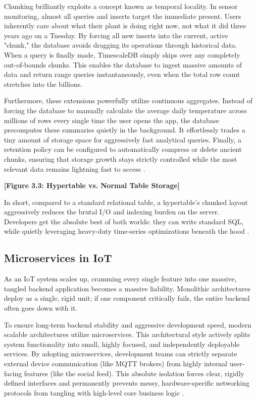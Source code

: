 Chunking brilliantly exploits a concept known as temporal locality. In sensor monitoring, almost all queries and inserts target the immediate present. Users inherently care about what their plant is doing right now, not what it did three years ago on a Tuesday. By forcing all new inserts into the current, active "chunk," the database avoids dragging its operations through historical data. When a query is finally made, TimescaleDB simply skips over any completely out-of-bounds chunks. This enables the database to ingest massive amounts of data and return range queries instantaneously, even when the total row count stretches into the billions.

Furthermore, these extensions powerfully utilize continuous aggregates. Instead of forcing the database to manually calculate the average daily temperature across millions of rows every single time the user opens the app, the database precomputes these summaries quietly in the background. It effortlessly trades a tiny amount of storage space for aggressively fast analytical queries. Finally, a retention policy can be configured to automatically compress or delete ancient chunks, ensuring that storage growth stays strictly controlled while the most relevant data remains lightning fast to access \cite{tigerdata_best_practices_hypertables, tigerdata_timescale_alternatives, tigerdata_caggs_retention, tigerdata_tsdb_compared}.

\textbf{[Figure 3.3: Hypertable vs. Normal Table Storage]}

In short, compared to a standard relational table, a hypertable's chunked layout aggressively reduces the brutal I/O and indexing burden on the server. Developers get the absolute best of both worlds: they can write standard SQL, while quietly leveraging heavy-duty time-series optimizations beneath the hood \cite{tigerdata_caggs_retention, tigerdata_tsdb_compared, tigerdata_best_practices_hypertables}.


\subsection{Microservices in IoT}

As an IoT system scales up, cramming every single feature into one massive, tangled backend application becomes a massive liability. Monolithic architectures deploy as a single, rigid unit; if one component critically fails, the entire backend often goes down with it. 

To ensure long-term backend stability and aggressive development speed, modern scalable architectures utilize microservices. This architectural style actively splits system functionality into small, highly focused, and independently deployable services. By adopting microservices, development teams can strictly separate external device communication (like MQTT brokers) from highly internal user-facing features (like the social feed). This absolute isolation forces clear, rigidly defined interfaces and permanently prevents messy, hardware-specific networking protocols from tangling with high-level core business logic \cite{microservices_io_gateway}.

